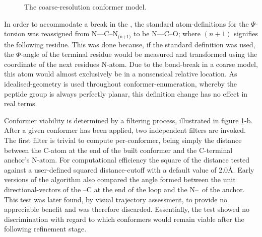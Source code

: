 \begin{figure}[hptb]
\begin{center}
\end{center}
\caption{The coarse-resolution conformer model.}
\label{fig:reduced_rep:conformer}
\end{figure}

In order to accommodate a break in the \mainchain, the standard atom-definitions for the $\Psi$- torsion was reassigned from \mbox{N--\ca--C--N$_\text{(n+1)}$}  to be \mbox{N--\ca--C--O}; where \mbox{$(n+1)$} signifies the following residue. This was done because, if the standard definition was used, the $\Phi$-angle of the terminal residue would be measured and transformed using the coordinate of the next residues N-atom.  Due to the bond-break in a coarse model, this atom would almost exclusively be in a nonsensical relative location. As idealised-geometry is used throughout conformer-enumeration, whereby the peptide group is always perfectly planar, this definition change has no effect in real terms. 

Conformer viability is determined by a filtering process, illustrated in figure \ref{fig:reduced_rep:conformer}-b. After a given conformer has been applied, two independent filters are invoked. The first filter is trivial to compute per-conformer, being simply the distance between the C-atom  at the end of the built conformer and the C-terminal anchor's N-atom. For computational efficiency the square of the distance tested against a user-defined squared distance-cutoff with a default value of 2.0\AA. Early versions of the algorithm also compared the angle formed between the unit directional-vectors of the  \ca--C at the end of the loop and the N--\ca\ of the anchor. This test was later found, by visual trajectory assessment, to provide no appreciable benefit and was therefore discarded. Essentially, the test showed no discrimination with regard to which conformers would remain viable after the following refinement   stage.

